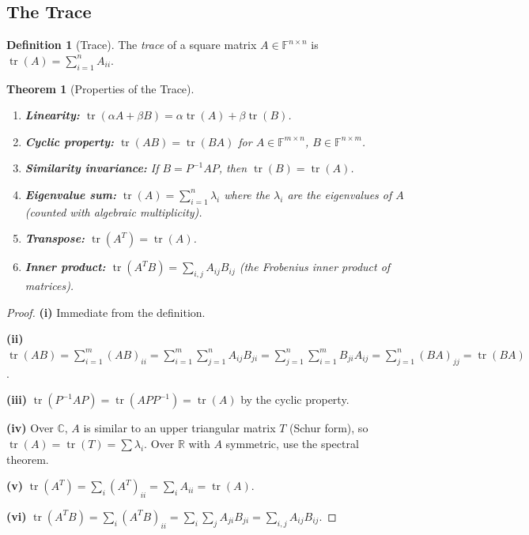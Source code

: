 \documentclass[11pt,a4paper]{article}
\theoremstyle{definition}
\newtheorem{definition}{Definition}[section]
\theoremstyle{plain}
\newtheorem{theorem}{Theorem}[section]
\theoremstyle{remark}
\newcommand{\R}{\mathbb{R}}
\newcommand{\C}{\mathbb{C}}
\newcommand{\F}{\mathbb{F}}
\DeclareMathOperator{\tr}{tr}
\begin{document}
\subsection{The Trace}
\label{subsec:trace}

\begin{definition}[Trace]
\label{def:trace}
The \emph{trace} of a square matrix $A \in \F^{n \times n}$ is
$\tr(A) = \sum_{i=1}^n A_{ii}$.
\end{definition}

\begin{theorem}[Properties of the Trace]
\label{thm:trace_properties}
\begin{enumerate}[nosep,label=(\roman*)]
    \item \textbf{Linearity:} $\tr(\alpha A + \beta B) = \alpha \tr(A) + \beta \tr(B)$.
    \item \textbf{Cyclic property:} $\tr(AB) = \tr(BA)$ for $A \in \F^{m \times n}$,
          $B \in \F^{n \times m}$.
    \item \textbf{Similarity invariance:} If $B = P^{-1}AP$, then $\tr(B) = \tr(A)$.
    \item \textbf{Eigenvalue sum:} $\tr(A) = \sum_{i=1}^n \lambda_i$ where the $\lambda_i$
          are the eigenvalues of $A$ (counted with algebraic multiplicity).
    \item \textbf{Transpose:} $\tr(A^T) = \tr(A)$.
    \item \textbf{Inner product:} $\tr(A^T B) = \sum_{i,j} A_{ij} B_{ij}$ (the Frobenius
          inner product of matrices).
\end{enumerate}
\end{theorem}

\begin{proof}
\textbf{(i)} Immediate from the definition.

\textbf{(ii)} $\tr(AB) = \sum_{i=1}^m (AB)_{ii} = \sum_{i=1}^m \sum_{j=1}^n A_{ij} B_{ji}
= \sum_{j=1}^n \sum_{i=1}^m B_{ji} A_{ij} = \sum_{j=1}^n (BA)_{jj} = \tr(BA)$.

\textbf{(iii)} $\tr(P^{-1}AP) = \tr(APP^{-1}) = \tr(A)$ by the cyclic property.

\textbf{(iv)} Over $\C$, $A$ is similar to an upper triangular matrix $T$ (Schur form),
so $\tr(A) = \tr(T) = \sum \lambda_i$. Over $\R$ with $A$ symmetric, use the spectral theorem.

\textbf{(v)} $\tr(A^T) = \sum_i (A^T)_{ii} = \sum_i A_{ii} = \tr(A)$.

\textbf{(vi)} $\tr(A^T B) = \sum_i (A^T B)_{ii} = \sum_i \sum_j A_{ji} B_{ji}
= \sum_{i,j} A_{ij} B_{ij}$.
\end{proof}
\end{document}
